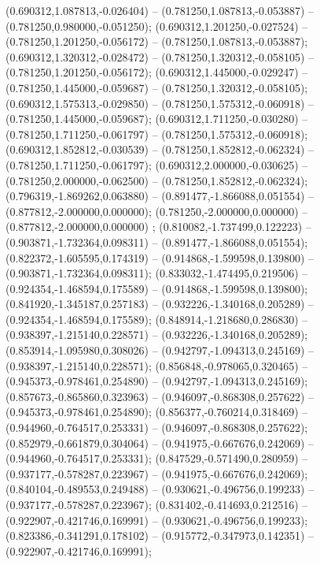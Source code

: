  (0.690312,1.087813,-0.026404) -- (0.781250,1.087813,-0.053887) -- (0.781250,0.980000,-0.051250);
 (0.690312,1.201250,-0.027524) -- (0.781250,1.201250,-0.056172) -- (0.781250,1.087813,-0.053887);
 (0.690312,1.320312,-0.028472) -- (0.781250,1.320312,-0.058105) -- (0.781250,1.201250,-0.056172);
 (0.690312,1.445000,-0.029247) -- (0.781250,1.445000,-0.059687) -- (0.781250,1.320312,-0.058105);
 (0.690312,1.575313,-0.029850) -- (0.781250,1.575312,-0.060918) -- (0.781250,1.445000,-0.059687);
 (0.690312,1.711250,-0.030280) -- (0.781250,1.711250,-0.061797) -- (0.781250,1.575312,-0.060918);
 (0.690312,1.852812,-0.030539) -- (0.781250,1.852812,-0.062324) -- (0.781250,1.711250,-0.061797);
 (0.690312,2.000000,-0.030625) -- (0.781250,2.000000,-0.062500) -- (0.781250,1.852812,-0.062324);
 (0.796319,-1.869262,0.063880) -- (0.891477,-1.866088,0.051554) -- (0.877812,-2.000000,0.000000);
 (0.781250,-2.000000,0.000000) -- (0.877812,-2.000000,0.000000) ;
 (0.810082,-1.737499,0.122223) -- (0.903871,-1.732364,0.098311) -- (0.891477,-1.866088,0.051554);
 (0.822372,-1.605595,0.174319) -- (0.914868,-1.599598,0.139800) -- (0.903871,-1.732364,0.098311);
 (0.833032,-1.474495,0.219506) -- (0.924354,-1.468594,0.175589) -- (0.914868,-1.599598,0.139800);
 (0.841920,-1.345187,0.257183) -- (0.932226,-1.340168,0.205289) -- (0.924354,-1.468594,0.175589);
 (0.848914,-1.218680,0.286830) -- (0.938397,-1.215140,0.228571) -- (0.932226,-1.340168,0.205289);
 (0.853914,-1.095980,0.308026) -- (0.942797,-1.094313,0.245169) -- (0.938397,-1.215140,0.228571);
 (0.856848,-0.978065,0.320465) -- (0.945373,-0.978461,0.254890) -- (0.942797,-1.094313,0.245169);
 (0.857673,-0.865860,0.323963) -- (0.946097,-0.868308,0.257622) -- (0.945373,-0.978461,0.254890);
 (0.856377,-0.760214,0.318469) -- (0.944960,-0.764517,0.253331) -- (0.946097,-0.868308,0.257622);
 (0.852979,-0.661879,0.304064) -- (0.941975,-0.667676,0.242069) -- (0.944960,-0.764517,0.253331);
 (0.847529,-0.571490,0.280959) -- (0.937177,-0.578287,0.223967) -- (0.941975,-0.667676,0.242069);
 (0.840104,-0.489553,0.249488) -- (0.930621,-0.496756,0.199233) -- (0.937177,-0.578287,0.223967);
 (0.831402,-0.414693,0.212516) -- (0.922907,-0.421746,0.169991) -- (0.930621,-0.496756,0.199233);
 (0.823386,-0.341291,0.178102) -- (0.915772,-0.347973,0.142351) -- (0.922907,-0.421746,0.169991);

